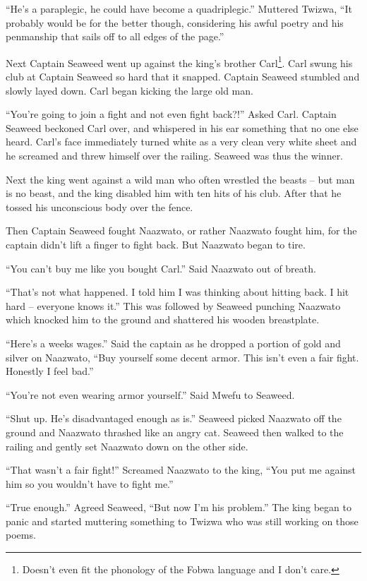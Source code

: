 ``He's a paraplegic, he could have become a quadriplegic.'' Muttered Twizwa, ``It probably would be for the better though, considering his awful poetry and his penmanship that sails off to all edges of the page.''

Next Captain Seaweed went up against the king's brother Carl\footnote{Doesn't even fit the phonology of the Fobwa language and I don't care.}.
Carl swung his club at Captain Seaweed so hard that it snapped. Captain Seaweed stumbled and slowly layed down. Carl began kicking the large old man.

``You're going to join a fight and not even fight back?!'' Asked Carl. Captain Seaweed beckoned Carl over, and whispered in his ear something that no one else heard. Carl's face immediately turned white as a very clean very white sheet and he screamed and threw himself over the railing. Seaweed was thus the winner.

Next the king went against a wild man who often wrestled the beasts -- but man is no beast, and the king disabled him with ten hits of his club. After that he tossed his unconscious body over the fence.

Then Captain Seaweed fought Naazwato, or rather Naazwato fought him, for the captain didn't lift a finger to fight back. But Naazwato began to tire.

``You can't buy me like you bought Carl.'' Said Naazwato out of breath.

``That's not what happened. I told him I was thinking about hitting back. I hit hard -- everyone knows it.'' This was followed by Seaweed punching Naazwato which knocked him to the ground and shattered his wooden breastplate.

``Here's a weeks wages.'' Said the captain as he dropped a portion of gold and silver on Naazwato, ``Buy yourself some decent armor. This isn't even a fair fight. Honestly I feel bad.''

``You're not even wearing armor yourself.'' Said Mwefu to Seaweed.

``Shut up. He's disadvantaged enough as is.'' Seaweed picked Naazwato off the ground and Naazwato thrashed like an angry cat. Seaweed then walked to the railing and gently set Naazwato down on the other side.

``That wasn't a fair fight!'' Screamed Naazwato to the king, ``You put me against him so you wouldn't have to fight me.''

``True enough.'' Agreed Seaweed, ``But now I'm his problem.'' The king began to panic and started muttering something to Twizwa who was still working on those poems.

